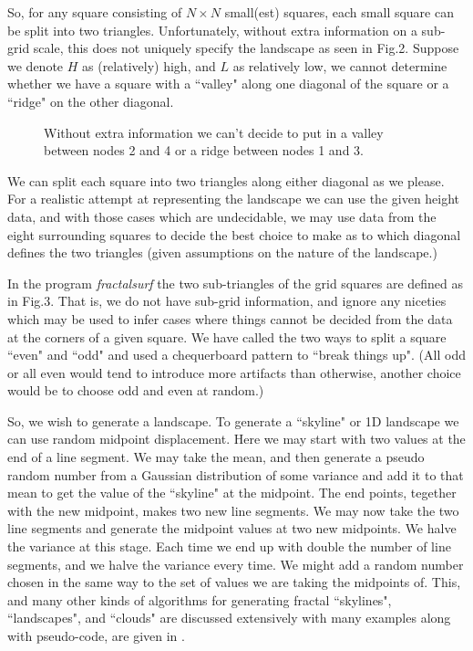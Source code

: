 \documentclass[12pt]{article}
\begin{document}
So, for any square consisting of $N\times N$ small(est) squares, each small square 
can be split into two triangles. Unfortunately, without extra information on a sub-grid scale, this 
does not uniquely specify the landscape as seen in Fig.2. Suppose we denote $H$ as (relatively) high, and
 $L$ as relatively low, we cannot determine whether we have a square with a ``valley" along one diagonal
of the square or a ``ridge" on the other diagonal.
\begin{figure}[htb]
\vspace*{10cm}
\caption{ Without extra information we can't decide to put in a valley between nodes 2 and 4 or a ridge between 
nodes 1 and 3.}
\end{figure}

We can split each square into two triangles along either diagonal as we please. For a realistic attempt at 
representing the landscape we can use the given height data, and with those cases which are undecidable, we may
use data from the eight surrounding squares to decide the best choice to make as to which 
diagonal defines the two triangles (given assumptions on the nature of
the landscape.) 

In the program {\it fractalsurf} the two sub-triangles of the grid squares are defined as in Fig.3.
That is, we do not have sub-grid information, and ignore any niceties which may be used to infer cases
where things cannot be decided from the data at the corners of a given square. We have called the two ways
to split a square ``even" and ``odd" and used a chequerboard pattern to ``break things up". (All odd or all even
would tend to introduce more artifacts than otherwise, another choice would be to choose odd and even at random.)

So, we wish to generate a landscape. To generate a ``skyline" or 1D landscape  we can use random midpoint
 displacement\cite{Fractals:Mybib}.
Here we may start with two values at the end of a line segment. We may take the mean, and then generate
a pseudo random number from a Gaussian distribution of some variance and add it to that mean to get the
value of the ``skyline" at the midpoint. The end points, tegether with the new midpoint, makes two new
 line segments.
We may now take the two line segments
and generate the midpoint values at two new midpoints. We halve the variance at this stage. Each time
we end up with double the number of line segments, and we halve the variance every time. We might add
 a random number chosen in the same way to the set of values we are taking the midpoints of.
This, and many other kinds of algorithms for generating fractal ``skylines", ``landscapes", and ``clouds"
are discussed extensively with many examples along with pseudo-code, are given in \cite{Fractals:Mybib}.
\end{document}
